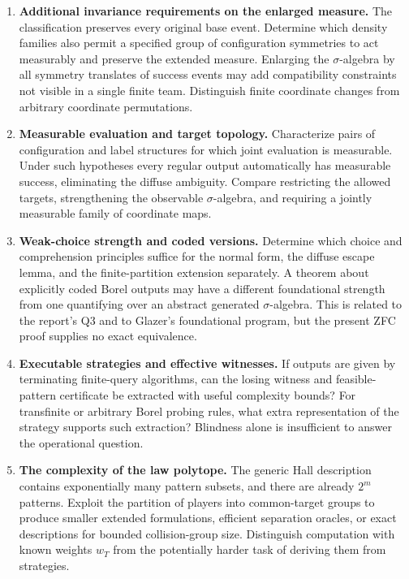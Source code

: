 \documentclass[11pt,letterpaper]{article}
\theoremstyle{definition}
\begin{document}
\begin{enumerate}[label=\textbf{R\arabic*.},leftmargin=2.9em,itemsep=0.7em]
\item \textbf{Additional invariance requirements on the enlarged measure.}
The classification preserves every original base event. Determine which density families also permit a specified group of configuration symmetries to act measurably and preserve the extended measure. Enlarging the $\sigma$-algebra by all symmetry translates of success events may add compatibility constraints not visible in a single finite team. Distinguish finite coordinate changes from arbitrary coordinate permutations.

\item \textbf{Measurable evaluation and target topology.}
Characterize pairs of configuration and label structures for which joint evaluation is measurable. Under such hypotheses every regular output automatically has measurable success, eliminating the diffuse ambiguity. Compare restricting the allowed targets, strengthening the observable $\sigma$-algebra, and requiring a jointly measurable family of coordinate maps.

\item \textbf{Weak-choice strength and coded versions.}
Determine which choice and comprehension principles suffice for the normal form, the diffuse escape lemma, and the finite-partition extension separately. A theorem about explicitly coded Borel outputs may have a different foundational strength from one quantifying over an abstract generated $\sigma$-algebra. This is related to the report's Q3 and to Glazer's foundational program, but the present ZFC proof supplies no exact equivalence.

\item \textbf{Executable strategies and effective witnesses.}
If outputs are given by terminating finite-query algorithms, can the losing witness and feasible-pattern certificate be extracted with useful complexity bounds? For transfinite or arbitrary Borel probing rules, what extra representation of the strategy supports such extraction? Blindness alone is insufficient to answer the operational question.

\item \textbf{The complexity of the law polytope.}
The generic Hall description contains exponentially many pattern subsets, and there are already $2^m$ patterns. Exploit the partition of players into common-target groups to produce smaller extended formulations, efficient separation oracles, or exact descriptions for bounded collision-group size. Distinguish computation with known weights $w_T$ from the potentially harder task of deriving them from strategies.


\end{enumerate}
\end{document}
